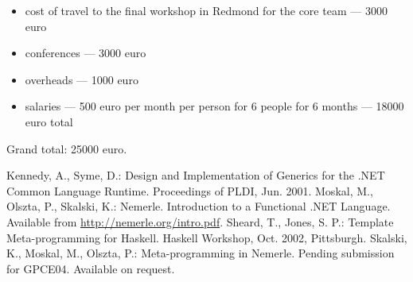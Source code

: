 \documentclass[a4paper,11pt]{article}
\begin{document}
\begin{itemize}
  \item cost of travel to the final workshop 
    in Redmond for the core team --- 3000 euro
  \item conferences --- 3000 euro
  \item overheads --- 1000 euro
  \item salaries --- 500 euro per month per person
    for 6 people for 6 months --- 18000 euro total
\end{itemize}

Grand total: 25000 euro.



\begin{thebibliography}{22}
Kennedy, A., Syme, D.:
Design and Implementation of Generics for the .NET Common Language Runtime.
Proceedings of PLDI, Jun. 2001.
Moskal, M., Olszta, P., Skalski, K.:
Nemerle. Introduction to a Functional .NET Language.
Available from \url{http://nemerle.org/intro.pdf}.
Sheard, T., Jones, S. P.:
Template Meta-programming for Haskell.
Haskell Workshop, Oct. 2002, Pittsburgh.
Skalski, K., Moskal, M., Olszta, P.:
Meta-programming in Nemerle.
Pending submission for GPCE04. Available on request.
\end{thebibliography}
\end{document}
